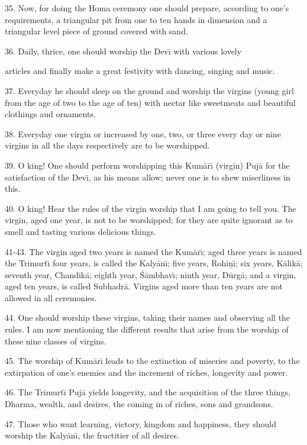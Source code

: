 35. Now, for doing the Homa ceremony one should prepare, according to one's requirements, a triangular pit from one to ten hands in dimension and a triangular level piece of ground covered with sand.

36. Daily, thrice, one should worship the Dev\={\i} with various lovely

articles and finally make a great festivity with dancing, singing and music.

37. Everyday he should sleep on the ground and worship the virgins (young girl from the age of two to the age of ten) with nectar like sweetmeats and beautiful clothings aud ornaments.

38. Everyday one virgin or increased by one, two, or three every day or nine virgins in all the days respectively are to be worshipped.

39. O king! One should perform worshipping this Kum\=ar\={\i} (virgin) Puj\=a for the satisfaction of the Dev\={\i}, as his means allow; never one is to shew miserliness in this.

40. O king! Hear the rules of the virgin worship that I am going to tell you. The virgin, aged one year, is not to be worshipped; for they are quite ignorant as to smell and tasting various delicious things.

41-43. The virgin aged two years is named the Kum\=ar\={\i}; aged three years is named the Trimurt\={\i} four years, is called the Kaly\=an\={\i}; five years, Rohi\d{n}\={\i}; six years, K\=alik\=a; seventh year, Chandik\=a; eighth year, \'S\=ambhav\={\i}; ninth year, D\=urg\=a; and a virgin, aged ten years, is called Subhadr\=a. Virgins aged more than ten years are not allowed in all ceremonies.

44. One should worship these virgins, taking their names and observing all the rules. I am now mentioning the different results that arise from the worship of these nine classes of virgins.

45. The worship of Kum\=ar\={\i} leads to the extinction of miseries and poverty, to the extirpation of one's enemies and the increment of riches, longevity and power.

46. The Trimurt\={\i} Puj\=a yields longevity, and the acquisition of the three things, Dharma, wealth, and desires, the coming in of riches, sons and grandsons.

47. Those who want learning, victory, kingdom and happiness, they should worship the Kaly\=an\={\i}, the fructitier of all desires.

